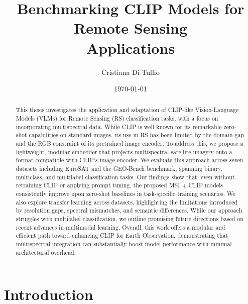 \documentclass[a4paper, oneside, english]{sapthesis} %
\title{Benchmarking CLIP Models for Remote Sensing \\Applications}
\author{Cristiana Di Tullio}
\date{\today}
\begin{document}
\frontmatter
\maketitle
\dedication{(add a dedication)}

\begin{abstract}
    This thesis investigates the application and adaptation of CLIP-like Vision-Language Models (VLMs) for Remote Sensing (RS) classification tasks, with a focus on incorporating multispectral data. While CLIP is well known for its remarkable zero-shot capabilities on standard images, its use in RS has been limited by the domain gap and the RGB constraint of its pretrained image encoder. To address this, we propose a lightweight, modular embedder that projects multispectral satellite imagery onto a format compatible with CLIP’s image encoder. We evaluate this approach across seven datasets including EuroSAT and the GEO-Bench benchmark, spanning binary, multiclass, and multilabel classification tasks. Our findings show that, even without retraining CLIP or applying prompt tuning, the proposed MSI + CLIP models consistently improve upon zero-shot baselines in task-specific training scenarios. We also explore transfer learning across datasets, highlighting the limitations introduced by resolution gaps, spectral mismatches, and semantic differences. While our approach struggles with multilabel classification, we outline promising future directions based on recent advances in multimodal learning. Overall, this work offers a modular and efficient path toward enhancing CLIP for Earth Observation, demonstrating that multispectral integration can substantially boost model performance with minimal architectural overhead.
\end{abstract}

\tableofcontents

\mainmatter

\chapter{Introduction} %
\end{document}
